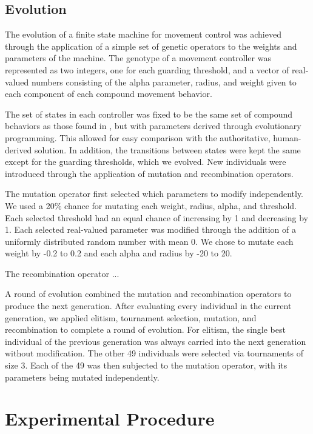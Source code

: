 \documentclass[12pt,journal,compsoc]{IEEEtran}
\begin{document}
\subsection{Evolution}

The evolution of a finite state machine for movement control was achieved through the application of a simple set of genetic operators to the weights and parameters of the machine. The genotype of a movement controller was represented as two integers, one for each guarding threshold, and a vector of real-valued numbers consisting of the alpha parameter, radius, and weight given to each component of each compound movement behavior.

The set of states in each controller was fixed to be the same set of compound behaviors as those found in \cite{rodriguez2004extending}, but with parameters derived through evolutionary programming. This allowed for easy comparison with the authoritative, human-derived solution. In addition, the transitions between states were kept the same except for the guarding thresholds, which we evolved. New individuals were introduced through the application of mutation and recombination operators.

The mutation operator first selected which parameters to modify independently. We used a 20\% chance for mutating each weight, radius, alpha, and threshold. Each selected threshold had an equal chance of increasing by 1 and decreasing by 1. Each selected real-valued parameter was modified through the addition of a uniformly distributed random number with mean 0. We chose to mutate each weight by -0.2 to 0.2 and each alpha and radius by -20 to 20.

The recombination operator ... %

A round of evolution combined the mutation and recombination operators to produce the next generation. After evaluating every individual in the current generation, we applied elitism, tournament selection, mutation, and recombination to complete a round of evolution. For elitism, the single best individual of the previous generation was always carried into the next generation without modification. The other 49 individuals were selected via tournaments of size 3. Each of the 49 was then subjected to the mutation operator, with its parameters being mutated independently.

\section{Experimental Procedure}
\end{document}
